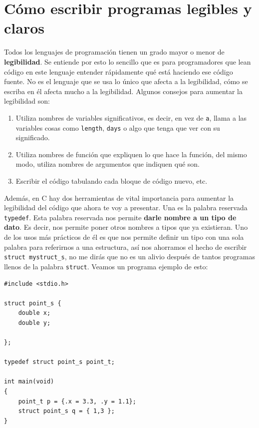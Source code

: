 \documentclass[a4paper]{article}
\begin{document}
\section{Cómo escribir programas legibles y claros}
Todos los lenguajes de programación tienen un grado mayor o menor de
\textbf{legibilidad}. Se entiende por esto lo sencillo que es para programadores
que lean código en este lenguaje entender rápidamente qué está haciendo ese
código fuente. No es el lenguaje que se usa lo único que afecta a la
legibilidad, cómo se escriba en él afecta mucho a la legibilidad. Algunos
consejos para aumentar la legibilidad son:
\begin{enumerate}
\item Utiliza nombres de variables significativos, es decir, en vez de \verb!a!,
llama a las variables cosas como \verb!length!, \verb!days! o algo que tenga
que ver con su significado.
\item Utiliza nombres de función que expliquen lo que hace la función, del mismo
modo, utiliza nombres de argumentos que indiquen qué son.
\item Escribir el código tabulando cada bloque de código nuevo, etc.
\end{enumerate}

Además, en C hay dos herramientas de vital importancia para aumentar la
legibilidad del código que ahora te voy a presentar. Una es la palabra
reservada \lstinline[style=C]!typedef!. Esta palabra reservada nos permite
\textbf{darle nombre a un tipo de dato}. Es decir, nos permite poner otros
nombres a tipos que ya existieran. Uno de los usos más prácticos de él es que
nos permite definir un tipo con una sola palabra para referirnos a una
estructura, así nos ahorramos el hecho de escribir \verb!struct mystruct_s!,
no me dirás que no es un alivio después de tantos programas llenos de la palabra
\verb!struct!. Veamos un programa ejemplo de esto:


\noindent
\begin{minipage}[H]{\linewidth}
\mbox{}
\begin{lstlisting}[style=C,
caption={Definición de un tipo a partir de una estructura},
label={lst:structTypeDefinition}]
#include <stdio.h>

struct point_s {
    double x;
    double y;

};

typedef struct point_s point_t;

int main(void)
{
    point_t p = {.x = 3.3, .y = 1.1};
    struct point_s q = { 1,3 };
}
\end{lstlisting}
\end{minipage}
\end{document}
